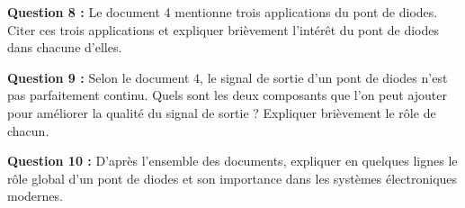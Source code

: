 \documentclass[11pt,a4paper]{article}
\begin{document}
\textbf{Question 8 :} Le document 4 mentionne trois applications du pont de diodes. Citer ces trois applications et expliquer brièvement l'intérêt du pont de diodes dans chacune d'elles.

\vspace{0.3cm}
\noindent
\fbox{\parbox{\dimexpr\textwidth-2\fboxsep-2\fboxrule\relax}{
\vspace{4cm}
\hspace{1cm}
\vspace{0.1cm}
}}
\vspace{0.5cm}

\textbf{Question 9 :} Selon le document 4, le signal de sortie d'un pont de diodes n'est pas parfaitement continu. Quels sont les deux composants que l'on peut ajouter pour améliorer la qualité du signal de sortie ? Expliquer brièvement le rôle de chacun.

\vspace{0.3cm}
\noindent
\fbox{\parbox{\dimexpr\textwidth-2\fboxsep-2\fboxrule\relax}{
\vspace{2cm}
\hspace{1cm}
\vspace{0.1cm}
}}
\vspace{0.5cm}

\textbf{Question 10 :} D'après l'ensemble des documents, expliquer en quelques lignes le rôle global d'un pont de diodes et son importance dans les systèmes électroniques modernes.

\vspace{0.3cm}
\noindent
\fbox{\parbox{\dimexpr\textwidth-2\fboxsep-2\fboxrule\relax}{
\vspace{3cm}
\hspace{1cm}
\vspace{0.1cm}
}}
\end{document}
